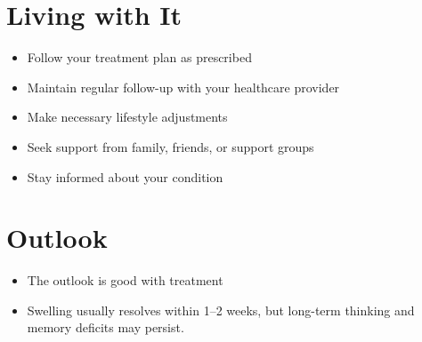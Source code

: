 \section{Living with It}
\begin{itemize}[noitemsep]
  \item Follow your treatment plan as prescribed
  \item Maintain regular follow-up with your healthcare provider
  \item Make necessary lifestyle adjustments
  \item Seek support from family, friends, or support groups
  \item Stay informed about your condition
\end{itemize}
\section{Outlook}
\begin{itemize}[noitemsep]
  \item The outlook is good with treatment
  \item Swelling usually resolves within 1--2 weeks, but long-term thinking and memory deficits may persist.
\end{itemize}
